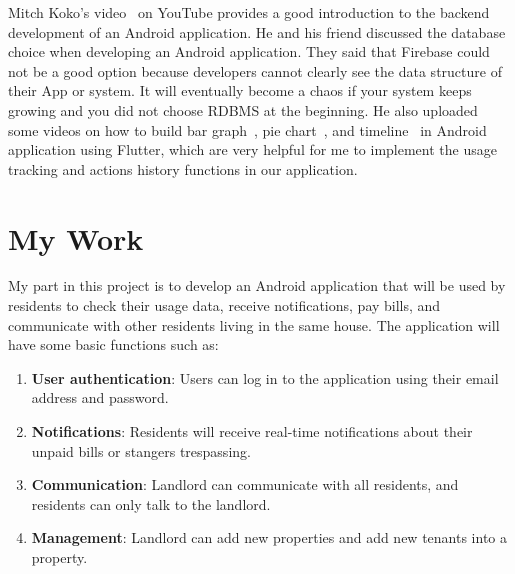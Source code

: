 \documentclass[sigconf,nonacm]{acmart}\settopmatter{printfolios=true}
\begin{document}
Mitch Koko's video~\cite{backendIntro} on YouTube provides a good introduction to the backend development of an Android application. He and his friend discussed the database choice when developing an Android application. They said that Firebase could not be a good option because developers cannot clearly see the data structure of their App or system. It will eventually become a chaos if your system keeps growing and you did not choose RDBMS at the beginning. He also uploaded some videos on how to build bar graph~\cite{barGraph}, pie chart~\cite{pieChart}, and timeline~\cite{timeline} in Android application using Flutter, which are very helpful for me to implement the usage tracking and actions history functions in our application.

\section{My Work}
My part in this project is to develop an Android application that will be used by residents to check their usage data, receive notifications, pay bills, and communicate with other residents living in the same house. The application will have
some basic functions such as: 
\begin{enumerate}
  \item \textbf{User authentication}: Users can log in to the application using their email address and password.
  \item \textbf{Notifications}: Residents will receive real-time notifications about their unpaid bills or stangers trespassing. 
  \item \textbf{Communication}: Landlord can communicate with all residents, and residents can only talk to the landlord. 
  \item \textbf{Management}: Landlord can add new properties and add new tenants into a property.
\end{enumerate}
\end{document}

